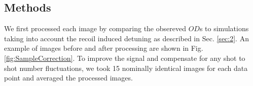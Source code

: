 \documentclass[12pt]{iopart}
\begin{document}
\subsection{Methods}
\par We first processed each image by comparing the obsereved $OD$s to simulations taking into account the recoil induced detuning as described in Sec. \ref{sec:2}. An example of images before and after processing are shown in Fig. \ref{fig:SampleCorrection}.  To improve the signal and compensate for any shot to shot number fluctuations, we took 15 nominally identical images for each data point and averaged the processed images. 
\begin{figure}

\end{figure}
\end{document}
